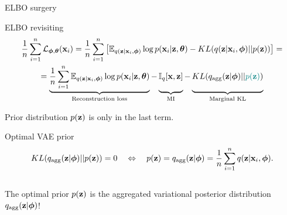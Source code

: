\begin{frame}{ELBO surgery}
	\begin{block}{ELBO revisiting}
		\vspace{-0.7cm}
		{\small
		\begin{multline*}
		    \frac{1}{n}\sum_{i=1}^n \cL_{\bphi, \btheta}(\bx_i) = \frac{1}{n} \sum_{i=1}^n \left[ \mathbb{E}_{q(\bz | \bx_i, \bphi)} \log p(\bx_i | \bz, \btheta) - KL(q(\bz | \bx_i, \bphi) || p(\bz)) \right] = \\
		    = \underbrace{\frac{1}{n} \sum_{i=1}^n \mathbb{E}_{q(\bz | \bx_i, \bphi)} \log p(\bx_i | \bz, \btheta)}_{\text{Reconstruction loss}} - \underbrace{\vphantom{ \sum_{i=1}^n} \bbI_q [\bx, \bz]}_{\text{MI}} - \underbrace{\vphantom{ \sum_{i=1}^n} KL(q_{\text{agg}}(\bz | \bphi) || {\color{teal}p(\bz)})}_{\text{Marginal KL}}
		\end{multline*}
		}
		\vspace{-0.3cm}
	\end{block}
	Prior distribution $p(\mathbf{z})$ is only in the last term.
	\begin{block}{Optimal VAE prior}
		\vspace{-0.7cm}
		\[
	  		KL(q_{\text{agg}}(\mathbf{z} | \boldsymbol{\phi}) || p(\mathbf{z})) = 0 \quad \Leftrightarrow \quad p (\mathbf{z}) = q_{\text{agg}}(\mathbf{z} | \boldsymbol{\phi}) = \frac{1}{n} \sum_{i=1}^n q(\mathbf{z} | \mathbf{x}_i, \boldsymbol{\phi}).
		\]
		\vspace{-0.4cm} \\
		The optimal prior $p(\mathbf{z})$ is the aggregated variational posterior distribution $q_{\text{agg}}(\mathbf{z} | \boldsymbol{\phi})$!
	\end{block}
	
\end{frame}

